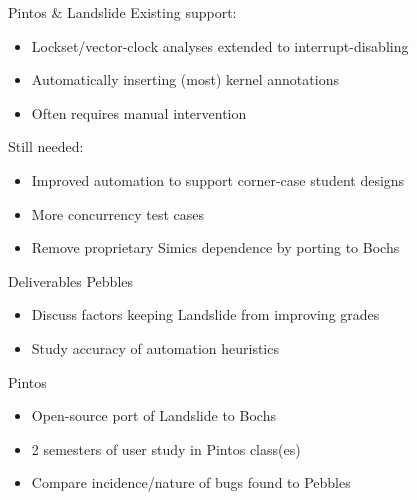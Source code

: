 \documentclass[xcolor=dvipsnames]{beamer}
\begin{document}
\begin{frame}{Pintos \& Landslide}
	Existing support:
	\begin{itemize}
		\item Lockset/vector-clock analyses extended to interrupt-disabling
		\item Automatically inserting (most) kernel annotations
		\item Often requires manual intervention
	\end{itemize}
	\linegap

	Still needed:
	\begin{itemize}
		\item Improved automation to support corner-case student designs
		\item More concurrency test cases
		\item Remove proprietary Simics dependence by porting to Bochs
	\end{itemize}
\end{frame}

\begin{frame}{Deliverables}
	Pebbles
	\begin{itemize}
		\item Discuss factors keeping Landslide from improving grades
		\item Study accuracy of automation heuristics
	\end{itemize}
	\linegap

	Pintos
	\begin{itemize}
		\item Open-source port of Landslide to Bochs
		\item 2 semesters of user study in Pintos class(es)
		\item Compare incidence/nature of bugs found to Pebbles
	\end{itemize}
	\linegap
\end{frame}

\end{document}
